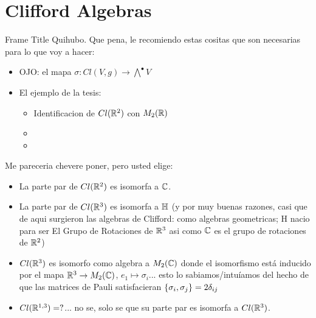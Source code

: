 \section{Clifford Algebras}



\begin{frame}{Frame Title} %
    \tiny
    Quihubo. Que pena, le recomiendo estas cositas que son necesarias para lo que voy a hacer:
    
        \begin{itemize}
        
        \item OJO: el mapa $\sigma : Cl(V, g) \to \bigwedge ^\bullet V$
        
        \item El ejemplo de la tesis: 
        
            \begin{itemize}
                
            \item Identificacion de $Cl(\mathbb R^2)$ con $M_2(\mathbb R)$
            
            \item 
            
            \item 
                
            \end{itemize}
            
        \end{itemize}
    
    Me pareceria chevere poner, pero usted elige:
    
        \begin{itemize}
            
        \item La parte par de $Cl(\mathbb R^2)$ es isomorfa a $\mathbb C$.
        
        \item La parte par de $Cl(\mathbb R^3)$ es isomorfa a $\mathbb H$ (y por muy buenas razones, casi que de aqui surgieron las algebras de Clifford: como algebras geometricas; H nacio para ser El Grupo de Rotaciones de $\mathbb R^3$ asi como $\mathbb C$ es el grupo de rotaciones de $\mathbb R^2$)
        
        \item $Cl(\mathbb R^3)$ es isomorfo como algebra a $M_2(\mathbb C)$ donde el isomorfismo está inducido por el mapa $\mathbb R^3 \to M_2(\mathbb C)$, $e_1 \mapsto \sigma_i$... esto lo sabiamos/intuíamos del hecho de que las matrices de Pauli satisfacieran $\{\sigma_i, \sigma_j\} = 2 \delta_{ij}$
        
        \item $Cl(\mathbb R^{1, 3}) = ?$... no se, solo se que su parte par es isomorfa a $Cl(\mathbb R^3)$.
            
        \end{itemize}
    
    \normalsize
\end{frame}
